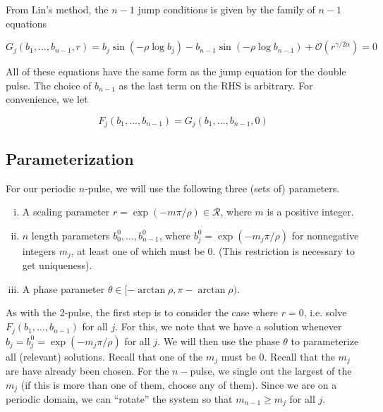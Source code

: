 \documentclass[12pt]{article}
\begin{document}
From Lin's method, the $n-1$ jump conditions is given by the family of $n-1$ equations

\begin{equation}\label{tildeGeq}
G_j(b_1, \dots, b_{n-1}, r) = b_j \sin \left( -\rho \log b_j \right) - b_{n-1} \sin \left( -\rho \log b_{n-1} \right) + \mathcal{O}(r^{\gamma / 2 \alpha}) = 0
\end{equation}

All of these equations have the same form as the jump equation for the double pulse. The choice of $b_{n-1}$ as the last term on the RHS is arbitrary. For convenience, we let 

\[
F_j(b_1, \dots, b_{n-1}) = G_j(b_1, \dots, b_{n-1}, 0)
\]

\subsection{Parameterization}

For our periodic $n$-pulse, we will use the following three (sets of) parameters.

\begin{enumerate}[(i)]
\item A scaling parameter $r = \exp(-m \pi / \rho ) \in \mathcal{R}$, where $m$ is a positive integer.
\item $n$ length parameters $b_0^0, \dots, b_{n-1}^0$, where $b_j^0 = \exp(-m_j \pi / \rho )$ for nonnegative integers $m_j$, at least one of which must be 0. (This restriction is necessary to get uniqueness).
\item A phase parameter $\theta \in [-\arctan \rho, \pi - \arctan \rho)$.
\end{enumerate}

As with the 2-pulse, the first step is to consider the case where $r = 0$, i.e. solve $F_j(b_1, \dots, b_{n-1})$ for all $j$. For this, we note that we have a solution whenever $b_j = b_j^0 = \exp(-m_j \pi / \rho )$ for all $j$. We will then use the phase $\theta$ to parameterize all (relevant) solutions. Recall that one of the $m_j$ must be 0. Recall that the $m_j$ are have already been chosen. For the $n-$pulse, we single out the largest of the $m_j$ (if this is more than one of them, choose any of them). Since we are on a periodic domain, we can ``rotate'' the system so that $m_{n-1} \geq m_j$ for all $j$. 			
											
\end{document}

